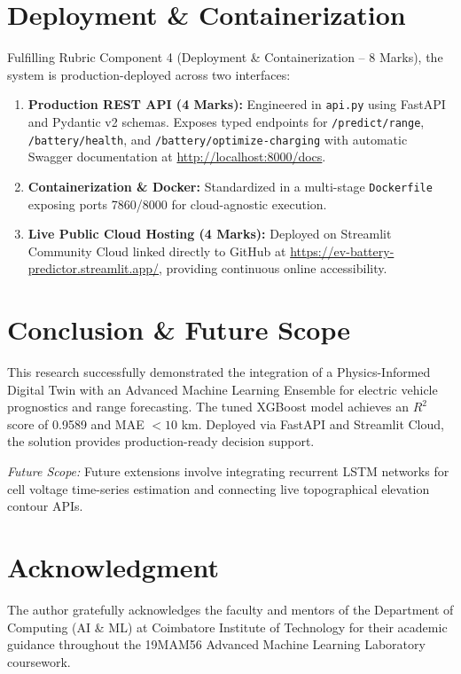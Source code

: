 \documentclass[journal]{IEEEtran}
\begin{document}
\section{Deployment \& Containerization}
Fulfilling Rubric Component 4 (Deployment \& Containerization -- 8 Marks), the system is production-deployed across two interfaces:
\begin{enumerate}
    \item \textbf{Production REST API (4 Marks):} Engineered in \texttt{api.py} using FastAPI and Pydantic v2 schemas. Exposes typed endpoints for \texttt{/predict/range}, \texttt{/battery/health}, and \texttt{/battery/optimize-charging} with automatic Swagger documentation at \url{http://localhost:8000/docs}.
    \item \textbf{Containerization \& Docker:} Standardized in a multi-stage \texttt{Dockerfile} exposing ports 7860/8000 for cloud-agnostic execution.
    \item \textbf{Live Public Cloud Hosting (4 Marks):} Deployed on Streamlit Community Cloud linked directly to GitHub at \url{https://ev-battery-predictor.streamlit.app/}, providing continuous online accessibility.
\end{enumerate}

\section{Conclusion \& Future Scope}
This research successfully demonstrated the integration of a Physics-Informed Digital Twin with an Advanced Machine Learning Ensemble for electric vehicle prognostics and range forecasting. The tuned XGBoost model achieves an $R^2$ score of 0.9589 and MAE $< 10$ km. Deployed via FastAPI and Streamlit Cloud, the solution provides production-ready decision support.

\textit{Future Scope:} Future extensions involve integrating recurrent LSTM networks for cell voltage time-series estimation and connecting live topographical elevation contour APIs.

\section*{Acknowledgment}
The author gratefully acknowledges the faculty and mentors of the Department of Computing (AI \& ML) at Coimbatore Institute of Technology for their academic guidance throughout the 19MAM56 Advanced Machine Learning Laboratory coursework.
\end{document}
